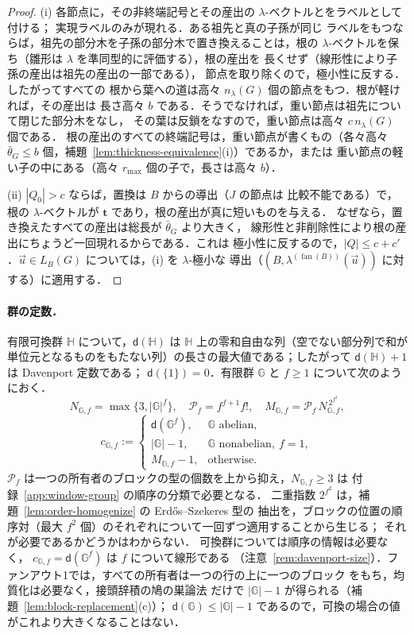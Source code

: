 \documentclass[11pt,a4paper]{ltjsarticle}
\numberwithin{equation}{section}
\theoremstyle{plain}
\theoremstyle{definition}
\theoremstyle{remark}
\newcommand{\tuple}[1]{\vec{#1}}
\newcommand{\fan}{\operatorname{fan}}
\theoremstyle{plain}
\begin{document}
\begin{proof}
(i) 各節点に，その非終端記号とその産出の $\lambda$-ベクトルとをラベルとして付ける；
実現ラベルのみが現れる．ある祖先と真の子孫が同じ
ラベルをもつならば，祖先の部分木を子孫の部分木で置き換えることは，根の
$\lambda$-ベクトルを保ち（雛形は $\lambda$ を準同型的に評価する），根の産出を
長くせず（線形性により子孫の産出は祖先の産出の一部である），
節点を取り除くので，極小性に反する．したがってすべての
根から葉への道は高々 $n_\lambda(G)$ 個の節点をもつ．根が軽ければ，その産出は
長さ高々 $b$ である．そうでなければ，重い節点は祖先について閉じた部分木をなし，
その葉は反鎖をなすので，重い節点は高々 $c\,n_\lambda(G)$ 個である．
根の産出のすべての終端記号は，重い節点が書くもの（各々高々
$\bar\theta_G\le b$ 個，補題~\ref{lem:thickness-equivalence}(i)）であるか，または
重い節点の軽い子の中にある（高々 $r_{\max}$ 個の子で，長さは高々 $b$）．

(ii) $|Q_0|>c$ ならば，置換は $B$ からの導出（$J$ の節点は
比較不能である）で，根の $\lambda$-ベクトルが $\mathbf t$ であり，根の産出が真に短いものを与える．
なぜなら，置き換えたすべての産出は総長が $\bar\theta_G$ より大きく，
線形性と非削除性により根の産出にちょうど一回現れるからである．これは
極小性に反するので，$|Q|\le c+c'$．$\tuple u\in L_B(G)$ については，(i) を $\lambda$-極小な
導出（$(B,\lambda^{(\fan(B))}(\tuple u))$ に対する）に適用する．
\end{proof}

\paragraph{群の定数．}
有限可換群 ${\mathbb H}$ について，$\mathsf d({\mathbb H})$ は
${\mathbb H}$ 上の零和自由な列（空でない部分列で和が
単位元となるものをもたない列）の長さの最大値である；したがって $\mathsf d({\mathbb H})+1$ は Davenport 定数である；
$\mathsf d(\{1\})=0$．有限群 ${\mathbb G}$ と $f\ge1$ について次のようにおく．
\[
 N_{{\mathbb G},f}=\max\{3,|{\mathbb G}|^f\},\quad
 \mathcal P_f=f^{f+1}f!,\quad
 M_{{\mathbb G},f}=\mathcal P_f\,N_{{\mathbb G},f}^{\,2^{f^2}},
\]
\[
 c_{{\mathbb G},f}:=
 \begin{cases}
 \mathsf d({\mathbb G}^f),&{\mathbb G}\text{ abelian},\\
 |{\mathbb G}|-1,&{\mathbb G}\text{ nonabelian},\ f=1,\\
 M_{{\mathbb G},f}-1,&\text{otherwise}.
 \end{cases}
\]
$\mathcal P_f$ は一つの所有者のブロックの型の個数を上から抑え，$N_{{\mathbb G},f}\ge3$ は
付録~\ref{app:window-group} の順序の分類で必要となる．
二重指数 $2^{f^2}$ は，補題~\ref{lem:order-homogenize} の Erd\H{o}s--Szekeres 型の
抽出を，ブロックの位置の順序対（最大 $f^2$ 個）のそれぞれについて一回ずつ適用することから生じる；
それが必要であるかどうかはわからない．
可換群については順序の情報は必要なく，
$c_{{\mathbb G},f}=\mathsf d({\mathbb G}^f)$ は $f$ について線形である
（注意~\ref{rem:davenport-size}）．ファンアウト1では，すべての所有者は一つの行の上に一つのブロック
をもち，均質化は必要なく，接頭辞積の鳩の巣論法
だけで $|{\mathbb G}|-1$ が得られる（補題~\ref{lem:block-replacement}(c)）；
$\mathsf d({\mathbb G})\le|{\mathbb G}|-1$ であるので，可換の場合の値がこれより大きくなることはない．
\end{document}
